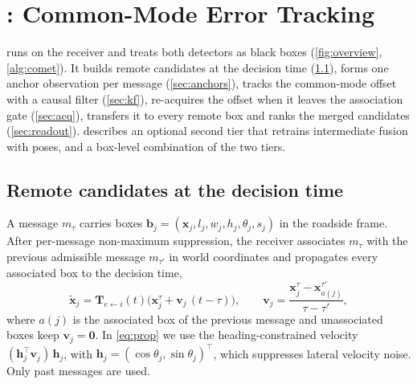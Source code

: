 \section{\method: Common-Mode Error Tracking}
\label{sec:method}

\method runs on the receiver and treats both detectors as black boxes (\cref{fig:overview}, \cref{alg:comet}).
It builds remote candidates at the decision time (\cref{sec:prop}), forms one anchor observation per message (\cref{sec:anchors}), tracks the common-mode offset with a causal filter (\cref{sec:kf}), re-acquires the offset when it leaves the association gate (\cref{sec:acq}), transfers it to every remote box and ranks the merged candidates (\cref{sec:readout}).
 describes an optional second tier that retrains intermediate fusion with \method poses, and a box-level combination of the two tiers.

\subsection{Remote candidates at the decision time}
\label{sec:prop}
A message $m_\tau$ carries boxes $\mathbf b_j=(\mathbf x_j,l_j,w_j,h_j,\theta_j,s_j)$ in the roadside frame.
After per-message non-maximum suppression, the receiver associates $m_\tau$ with the previous admissible message $m_{\tau'}$ in world coordinates and propagates every associated box to the decision time,
\begin{equation}
  \tilde{\mathbf x}_j=\mathbf T_{e\leftarrow i}(t)\big(\mathbf x_j^{\tau}+\mathbf v_j\,(t-\tau)\big),\qquad
  \mathbf v_j=\frac{\mathbf x_j^{\tau}-\mathbf x_{a(j)}^{\tau'}}{\tau-\tau'},
  \label{eq:prop}
\end{equation}
where $a(j)$ is the associated box of the previous message and unassociated boxes keep $\mathbf v_j=\mathbf 0$.
In \cref{eq:prop} we use the heading-constrained velocity $(\mathbf h_j^{\top}\mathbf v_j)\,\mathbf h_j$, with $\mathbf h_j=(\cos\theta_j,\sin\theta_j)^{\top}$, which suppresses lateral velocity noise.
Only past messages are used.

